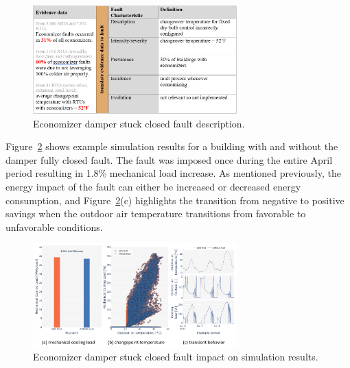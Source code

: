 \begin{figure}
  \centering \includegraphics[width=0.7\textwidth]{figures/econ_damper_fault.png}
  \caption{Economizer damper stuck closed fault description.}
  \label{fig:econ_damper_fault}
\end{figure}

Figure~\ref{fig:econ_damper_fault_single_model} shows example simulation results for a building with and without the damper fully closed fault. The fault was imposed once during the entire April period resulting in 1.8\% mechanical load increase. As mentioned previously, the energy impact of the fault can either be increased or decreased energy consumption, and Figure~\ref{fig:econ_damper_fault_single_model}(c) highlights the transition from negative to positive savings when the outdoor air temperature transitions from favorable to unfavorable conditions.

\begin{figure}
  \centering \includegraphics[width=0.7\textwidth]{figures/econ_damper_fault_single_model.png}
  \caption{Economizer damper stuck closed fault impact on simulation results.}
  \label{fig:econ_damper_fault_single_model}
\end{figure}

